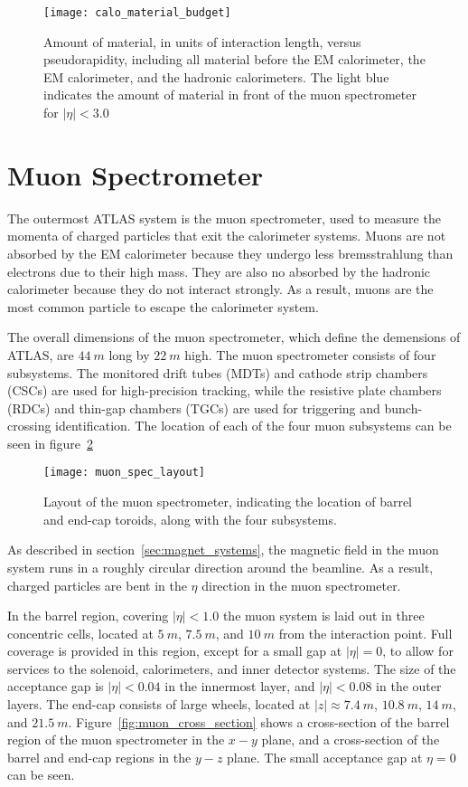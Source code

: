 \begin{figure}[!ht]\centering
\texttt{[image: calo\_material\_budget]}
\caption{Amount of material, in units of interaction length, versus pseudorapidity, including all material before the
EM calorimeter, the EM calorimeter, and the hadronic calorimeters. The light blue indicates the amount of material in front
of the muon spectrometer for $|\eta| < 3.0$}
\label{fig:calo_material_budget}\cite{atlas-detector-2008}
\end{figure}

\section{Muon Spectrometer}\label{sec:muon_spec}

The outermost ATLAS system is the muon spectrometer, used to measure the momenta of charged particles that exit the calorimeter systems.
Muons are not absorbed by the EM calorimeter because they undergo less bremsstrahlung than electrons due to their high mass.
They are also no absorbed by the hadronic calorimeter because they do not interact strongly.
As a result, muons are the most common particle to escape the calorimeter system.

The overall dimensions of the muon spectrometer, which define the demensions of ATLAS, are $44~m$ long by $22~m$ high.
The muon spectrometer consists of four subsystems.
The monitored drift tubes (MDTs) and cathode strip chambers (CSCs) are used for high-precision tracking,
while the resistive plate chambers (RDCs) and thin-gap chambers (TGCs) are used for triggering and bunch-crossing identification.
The location of each of the four muon subsystems can be seen in figure~\ref{fig:muon_spec_layout}

\begin{figure}[!ht]\centering
\texttt{[image: muon\_spec\_layout]}
\caption{Layout of the muon spectrometer, indicating the location of barrel and end-cap toroids, along with the four subsystems.}
\label{fig:muon_spec_layout}\cite{atlas-detector-2008}
\end{figure}

As described in section~\ref{sec:magnet_systems}, the magnetic field in the muon system runs in a roughly circular direction around the beamline.
As a result, charged particles are bent in the $\eta$ direction in the muon spectrometer.

In the barrel region, covering $|\eta| < 1.0$ the muon system is laid out in three concentric cells,
located at $5~m$, $7.5~m$, and $10~m$ from the interaction point.
Full coverage is provided in this region, except for a small gap at $|\eta| = 0$, to allow for services to the solenoid,
calorimeters, and inner detector systems.
The size of the acceptance gap is $|\eta| < 0.04$ in the innermost layer, and $|\eta| < 0.08$ in the outer layers.
The end-cap consists of large wheels, located at $|z| \approx 7.4~m$, $10.8~m$, $14~m$, and $21.5~m$.
Figure~\ref{fig:muon_cross_section} shows a cross-section of the barrel region of the muon spectrometer in the $x-y$ plane,
and a cross-section of the barrel and end-cap regions in the $y-z$ plane.
The small acceptance gap at $\eta = 0$ can be seen.

